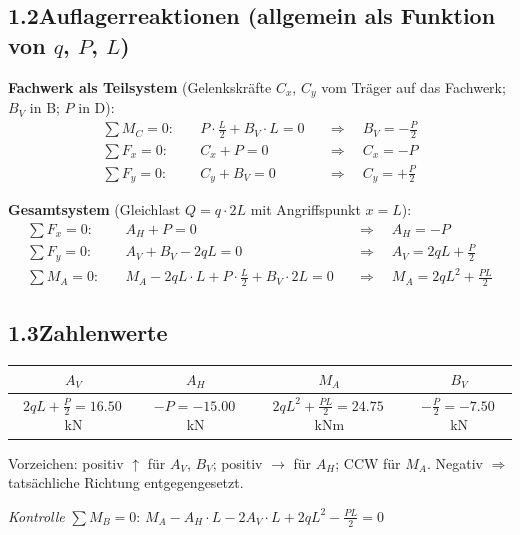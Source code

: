 \documentclass[a4paper,11pt]{article}
\begin{document}
\subsection*{1.2\quad Auflagerreaktionen (allgemein als Funktion von $q$, $P$, $L$)}

\textbf{Fachwerk als Teilsystem}
(Gelenkskräfte $C_x$, $C_y$ vom Träger auf das Fachwerk; $B_V$ in B; $P$ in D):
\begin{align*}
  \sum M_C = 0:\quad & P \cdot \tfrac{L}{2} + B_V \cdot L = 0
    &&\Rightarrow\quad \boxed{B_V = -\tfrac{P}{2}} \\
  \sum F_x = 0:\quad & C_x + P = 0
    &&\Rightarrow\quad C_x = -P \\
  \sum F_y = 0:\quad & C_y + B_V = 0
    &&\Rightarrow\quad C_y = +\tfrac{P}{2}
\end{align*}

\textbf{Gesamtsystem} (Gleichlast $Q = q \cdot 2L$ mit Angriffspunkt $x = L$):
\begin{align*}
  \sum F_x = 0:\quad & A_H + P = 0
    &&\Rightarrow\quad \boxed{A_H = -P} \\
  \sum F_y = 0:\quad & A_V + B_V - 2qL = 0
    &&\Rightarrow\quad \boxed{A_V = 2qL + \tfrac{P}{2}} \\
  \sum M_A = 0:\quad & M_A - 2qL \cdot L + P\cdot\tfrac{L}{2} + B_V \cdot 2L = 0
    &&\Rightarrow\quad \boxed{M_A = 2qL^2 + \tfrac{PL}{2}}
\end{align*}

\subsection*{1.3\quad Zahlenwerte}

\begin{center}
\begin{tabular}{cccc}
\toprule
$A_V$ & $A_H$ & $M_A$ & $B_V$ \\
\midrule
$2qL + \tfrac{P}{2} = \mathbf{16.50}$\,kN
& $-P = \mathbf{-15.00}$\,kN
& $2qL^2 + \tfrac{PL}{2} = \mathbf{24.75}$\,kNm
& $-\tfrac{P}{2} = \mathbf{-7.50}$\,kN \\
\bottomrule
\end{tabular}
\end{center}

Vorzeichen: positiv $\uparrow$ für $A_V$, $B_V$; positiv $\rightarrow$ für $A_H$;
CCW für $M_A$. Negativ $\Rightarrow$ tatsächliche Richtung entgegengesetzt.

\textit{Kontrolle} $\sum M_B = 0$:
$M_A - A_H \cdot L - 2A_V \cdot L + 2qL^2 - \tfrac{PL}{2} = 0$\;
\checkmark
\end{document}
